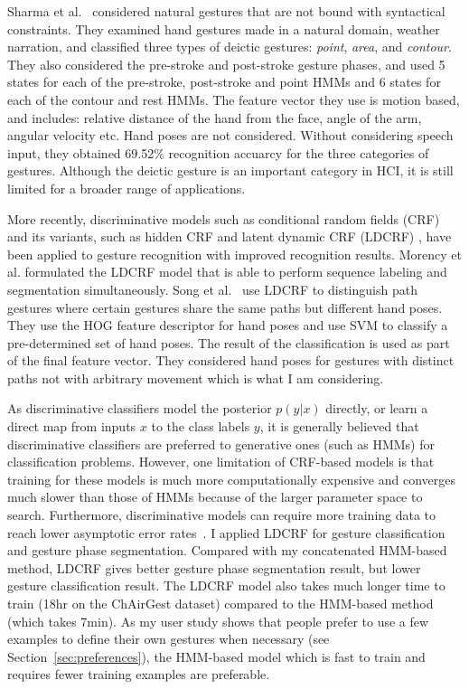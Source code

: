 Sharma et al.~\cite{sharma00} considered natural gestures that are not
bound with syntactical constraints. They examined hand gestures made in a
natural domain, weather narration, and classified three types of
deictic gestures:
\textit{point}, \textit{area}, and \textit{contour}. They also
considered the pre-stroke and post-stroke gesture phases, and used 5 states for
each of the pre-stroke, post-stroke and point HMMs and 6 states for each of the
contour and rest HMMs. The feature vector they use is motion based, and
includes: relative distance of the hand from the face, angle of the arm, angular
velocity etc. Hand poses are not considered. Without considering speech input,
they obtained 69.52\% recognition accuarcy for the three categories of gestures.
Although the deictic gesture is an important category in HCI, it is still
limited for a broader range of applications.

More recently, discriminative models such as
conditional random fields (CRF) and its variants, such as hidden CRF
\cite{wang06} and latent dynamic CRF (LDCRF) \cite{morency07}, have been
applied to gesture recognition with improved recognition results. Morency et al.
\cite{morency07} formulated the LDCRF model that is able to perform sequence labeling and segmentation simultaneously. 
Song et al.~\cite{song12} use LDCRF to distinguish path gestures where
certain gestures share the same paths but different hand poses. They use the HOG
feature descriptor for hand poses and use SVM to classify a pre-determined
set of hand poses. The result of the classification is used as part of the final
feature vector. They considered hand poses for gestures with distinct paths not
with arbitrary movement which is what I am considering.

As discriminative classifiers model the posterior $p(y|x)$ directly, or
learn a direct map from inputs $x$ to the class labels $y$, it is
generally believed that discriminative classifiers are preferred to
generative ones (such as HMMs) for classification problems.
However, one limitation of CRF-based models is that training for these models
is much more computationally expensive and converges much slower than those of
HMMs \cite{lafferty01} because of the larger parameter space to search.
Furthermore, discriminative models can require more training data to reach
lower asymptotic error rates~\cite{ng02}. I applied LDCRF for gesture
classification and gesture phase segmentation.
Compared with my concatenated HMM-based method, LDCRF gives better gesture phase
segmentation result, but lower gesture classification result. The LDCRF model
also takes much longer time to train (18hr on the ChAirGest dataset) compared to
the HMM-based method (which takes 7min). As my user study shows that people
prefer to use a few examples to define their own gestures when necessary (see
Section~\ref{sec:preferences}), the HMM-based model which is fast to train and
requires fewer training examples are preferable.

